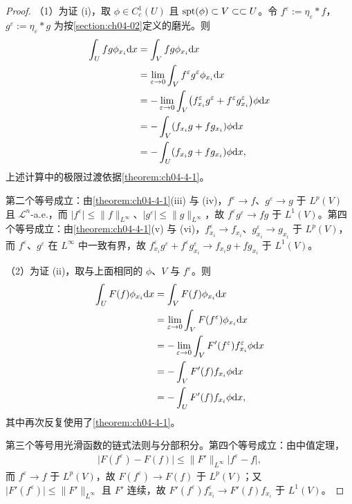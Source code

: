 \documentclass[../../main.tex]{subfiles}%
\begin{document}
\begin{proof}
（1）为证 (i)，取 $\phi\in C_c^1(U)$ 且 $\operatorname{spt}(\phi)\subset V\subset\subset U$。令 $f^\varepsilon:=\eta_\varepsilon*f$，$g^\varepsilon:=\eta_\varepsilon*g$ 为按\cref{section:ch04-02}定义的磨光。则 %
\begin{align*}
\int_U fg\phi_{x_i}\mathrm{d} x
&=\int_V fg\phi_{x_i}\mathrm{d} x\\
&=\lim_{\varepsilon\to0}\int_V f^\varepsilon g^\varepsilon\phi_{x_i}\mathrm{d} x\\
&=-\lim_{\varepsilon\to0}\int_V\bigl(f^\varepsilon_{x_i}g^\varepsilon+f^\varepsilon g^\varepsilon_{x_i}\bigr)\phi\mathrm{d} x\\
&=-\int_V(f_{x_i}g+fg_{x_i})\phi\mathrm{d} x\\
&=-\int_U(f_{x_i}g+fg_{x_i})\phi\mathrm{d} x,
\end{align*}
上述计算中的极限过渡依据\cref{theorem:ch04-4-1}。%

第二个等号成立：由\cref{theorem:ch04-4-1}(iii) 与 (iv)，$f^\varepsilon\to f$、$g^\varepsilon\to g$ 于 $L^p(V)$ 且 $\mathcal{L}^n$-a.e.，而 $\lvert f^\varepsilon\rvert\leqslant\lVert f\rVert_{L^\infty}$、$\lvert g^\varepsilon\rvert\leqslant\lVert g\rVert_{L^\infty}$，故 $f^\varepsilon g^\varepsilon\to fg$ 于 $L^1(V)$。第四个等号成立：由\cref{theorem:ch04-4-1}(v) 与 (vi)，$f^\varepsilon_{x_i}\to f_{x_i}$、$g^\varepsilon_{x_i}\to g_{x_i}$ 于 $L^p(V)$，而 $f^\varepsilon$、$g^\varepsilon$ 在 $L^\infty$ 中一致有界，故 $f^\varepsilon_{x_i}g^\varepsilon+f^\varepsilon g^\varepsilon_{x_i}\to f_{x_i}g+fg_{x_i}$ 于 $L^1(V)$。%

（2）为证 (ii)，取与上面相同的 $\phi$、$V$ 与 $f^\varepsilon$。则
\begin{align*}
\int_U F(f)\phi_{x_i}\mathrm{d} x
&=\int_V F(f)\phi_{x_i}\mathrm{d} x\\
&=\lim_{\varepsilon\to0}\int_V F(f^\varepsilon)\phi_{x_i}\mathrm{d} x\\
&=-\lim_{\varepsilon\to0}\int_V F'(f^\varepsilon)f^\varepsilon_{x_i}\phi\mathrm{d} x\\
&=-\int_V F'(f)f_{x_i}\phi\mathrm{d} x\\
&=-\int_U F'(f)f_{x_i}\phi\mathrm{d} x,
\end{align*}
其中再次反复使用了\cref{theorem:ch04-4-1}。%

第三个等号用光滑函数的链式法则与分部积分。第四个等号成立：由中值定理，
\begin{align*}
\lvert F(f^\varepsilon)-F(f)\rvert\leqslant\lVert F'\rVert_{L^\infty}\lvert f^\varepsilon-f\rvert,
\end{align*}
而 $f^\varepsilon\to f$ 于 $L^p(V)$，故 $F(f^\varepsilon)\to F(f)$ 于 $L^p(V)$；又 $\lvert F'(f^\varepsilon)\rvert\leqslant\lVert F'\rVert_{L^\infty}$ 且 $F'$ 连续，故 $F'(f^\varepsilon)f^\varepsilon_{x_i}\to F'(f)f_{x_i}$ 于 $L^1(V)$。%


\end{proof}
\end{document}
